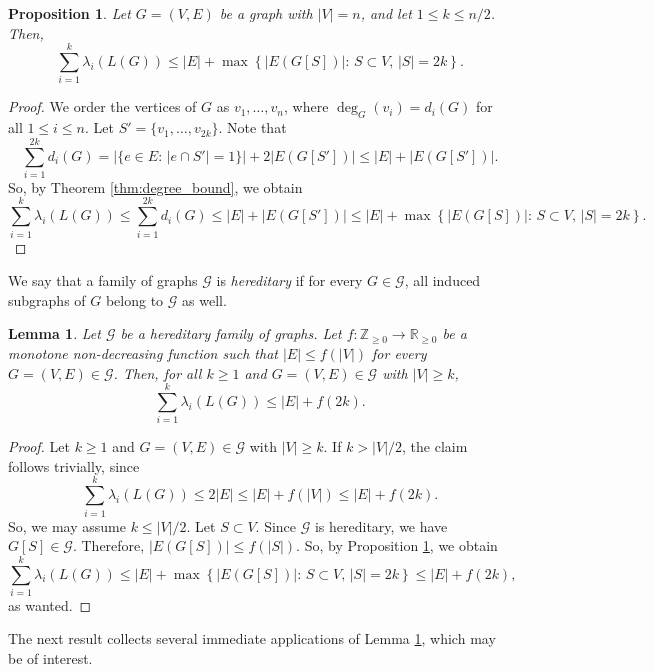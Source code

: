 \documentclass[a4paper,11pt]{article}
\theoremstyle{plain}
\newtheorem{proposition}[theorem]{\bf Proposition}
\newtheorem{lemma}[theorem]{\bf Lemma}
\theoremstyle{definition}
\numberwithin{theorem}{section}
\numberwithin{equation}{section}
\begin{document}
\begin{proposition}\label{prop:2k_set}
    Let $G=(V,E)$ be a graph with $|V|=n$, and let $1\le k\le n/2$. Then,
    \[
        \sum_{i=1}^k \lambda_i(L(G))\le |E| + \max \left\{ |E(G[S])| :\, S\subset V,\, |S|=2k\right\}.
    \]
\end{proposition}
\begin{proof}
    We order the vertices of $G$ as $v_1,\ldots,v_n$, where $\deg_G(v_i)=d_i(G)$ for all $1\le i\le n$. Let $S'=\{v_1,\ldots,v_{2k}\}$.
    Note that
    \[
        \sum_{i=1}^{2k} d_i(G) = \left| \{e\in E:\, |e\cap S'|=1\}\right| + 2|E(G[S'])| \le |E|+|E(G[S'])|.
    \]
 So, by Theorem \ref{thm:degree_bound}, we obtain
 \[
    \sum_{i=1}^k \lambda_i(L(G)) \le \sum_{i=1}^{2k} d_i(G) \le |E|+|E(G[S'])| \le  |E| + \max \left\{ |E(G[S])| :\, S\subset V,\, |S|=2k\right\}.
 \]
\end{proof}


We say that a family of graphs $\mathcal{G}$ is \emph{hereditary} if for every $G\in\mathcal{G}$, all induced subgraphs of $G$ belong to $\mathcal{G}$ as well.

\begin{lemma}\label{lemma:apps}
    Let $\mathcal{G}$ be a hereditary family of graphs. Let $f:\mathbb{Z}_{\ge 0} \to \mathbb{R}_{\ge 0}$ be a monotone non-decreasing function such that $|E|\le f(|V|)$ for every $G=(V,E)\in \mathcal{G}$. Then, for all $k\ge 1$ and $G=(V,E)\in \mathcal{G}$ with $|V|\ge k$,
    \[
        \sum_{i=1}^k \lambda_i(L(G))\le |E|+f(2k).
    \]
\end{lemma}
\begin{proof}
    Let $k\ge 1$ and $G=(V,E)\in\mathcal{G}$ with $|V|\ge k$. 
    If $k>|V|/2$, the claim follows trivially, since
    \[
        \sum_{i=1}^k \lambda_i(L(G)) \le 2|E|\le |E|+ f(|V|)\le |E|+ f(2k). 
    \]
    So, we may assume $k\le |V|/2$. Let $S\subset V$. Since $\mathcal{G}$ is hereditary, we have $G[S]\in \mathcal{G}$. Therefore, $|E(G[S])|\le f(|S|)$. So, by Proposition \ref{prop:2k_set}, we obtain
    \[
         \sum_{i=1}^k \lambda_i(L(G)) \le |E|+ \max \left\{ |E(G[S])| :\, S\subset V,\, |S|=2k\right\} \le  |E|+f(2k),
    \]
    as wanted.
\end{proof}

The next result collects several immediate applications of Lemma \ref{lemma:apps}, which may be of interest.
\end{document}
